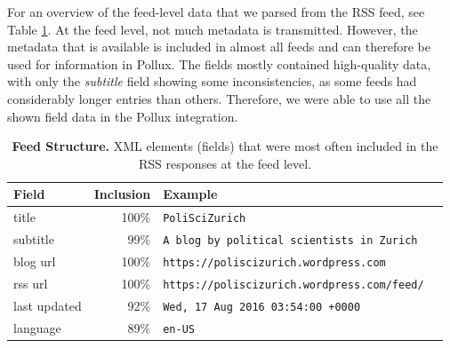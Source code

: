 \documentclass{article}
\begin{document}
For an overview of the feed-level data that we parsed from the RSS feed, see Table \ref{tab:feed_structure}.
At the feed level, not much metadata is transmitted. However, the metadata that is available is included in almost all feeds and can therefore be used for information in Pollux. The fields mostly contained high-quality data, with only the \textit{subtitle} field showing some inconsistencies, as some feeds had considerably longer entries than others. Therefore, we were able to use all the shown field data in the Pollux integration.
\begin{table}[htb]
    \caption{\textbf{Feed Structure.} XML elements (fields) that were most often included in the RSS responses at the feed level.}
    \centering
    \begin{tabular}{lrl}
        \toprule
        \cmidrule(r){1-2}
        \textbf{Field} & \textbf{Inclusion} & \textbf{Example}                                   \\
        \midrule
        title          & 100\%              & \verb|PoliSciZurich                              | \\
        subtitle       & 99\%               & \verb|A blog by political scientists in Zurich   | \\
        blog url       & 100\%              & \verb|https://poliscizurich.wordpress.com        | \\
        rss url        & 100\%              & \verb|https://poliscizurich.wordpress.com/feed/  | \\
        last updated   & 92\%               & \verb|Wed, 17 Aug 2016 03:54:00 +0000            | \\
        language       & 89\%               & \verb|en-US|                                       \\
        \bottomrule
    \end{tabular}
    \label{tab:feed_structure}
\end{table}
\end{document}
